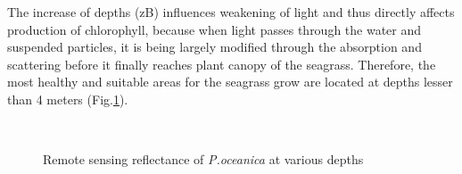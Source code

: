 \documentclass[10pt, a4paper]{article}
\begin{document}
The increase of depths (zB) influences weakening of light and thus directly affects
production of chlorophyll, because when light passes through the water and suspended particles, it is
being largely modified through the absorption and scattering before it finally reaches plant canopy of
the seagrass. Therefore, the most healthy and suitable areas for the seagrass grow are located at depths
lesser than 4 meters (Fig.\ref{fig:4.9}).

\begin{figure}[H]
	\centering
	\\
	\caption{Remote sensing reflectance of \textit{P.oceanica} at various depths}
	\label{fig:4.9}
\end{figure}
\end{document}
